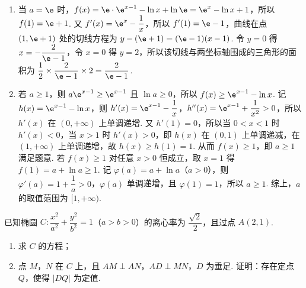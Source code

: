 \begin{solution}
\begin{enumerate}
\item 当 \(a=\e\) 时，\(f(x)=\e\cdot\e^{x-1}-\ln x+\ln\e=\e^x-\ln x+1\)，所以 \(f(1)=\e+1\). 又 \(f'(x)=\e^x-\dfrac1x\)，所以 \(f'(1)=\e-1\)，曲线在点 \((1,\e+1)\) 处的切线方程为 \(y-(\e+1)=(\e-1)(x-1)\). 令 \(y=0\) 得 \(x=-\dfrac{2}{\e-1}\)，令 \(x=0\) 得 \(y=2\)，所以该切线与两坐标轴围成的三角形的面积为 \(\dfrac12\times\dfrac{2}{\e-1}\times2=\dfrac{2}{\e-1}\).
\item 若 \(a\ge1\)，则 \(a\e^{x-1}\ge\e^{x-1}\) 且 \(\ln a\ge0\)，所以 \(f(x)\ge\e^{x-1}-\ln x\). 记 \(h(x)=\e^{x-1}-\ln x\)，则 \(h'(x)=\e^{x-1}-\dfrac1x\)，\(h''(x)=\e^{x-1}+\dfrac1{x^2}>0\)，所以 \(h'(x)\) 在 \((0,+\infty)\) 上单调递增. 又 \(h'(1)=0\)，所以当 \(0<x<1\) 时 \(h'(x)<0\)，当 \(x>1\) 时 \(h'(x)>0\)，即 \(h(x)\) 在 \((0,1)\) 上单调递减，在 \((1,+\infty)\) 上单调递增，故 \(h(x)\ge h(1)=1\). 从而 \(f(x)\ge1\)，即 \(a\ge1\) 满足题意.
若 \(f(x)\ge1\) 对任意 \(x>0\) 恒成立，取 \(x=1\) 得 \(f(1)=a+\ln a\ge1\). 记 \(\varphi(a)=a+\ln a\)（\(a>0\)），则 \(\varphi'(a)=1+\dfrac1a>0\)，\(\varphi(a)\) 单调递增，且 \(\varphi(1)=1\)，所以 \(a\ge1\). 综上，\(a\) 的取值范围为 \([1,+\infty)\).
\end{enumerate}
\end{solution}

\begin{problem}
已知椭圆 \(C:\dfrac{x^2}{a^2}+\dfrac{y^2}{b^2}=1\)（\(a>b>0\)）的离心率为 \(\dfrac{\sqrt{2}}{2}\)，且过点 \(A\left( 2,1 \right)\).

\begin{enumerate}
\item 求 \(C\) 的方程；
\item 点 \(M\)，\(N\) 在 \(C\) 上，且 \(AM\perp AN\)，\(AD\perp MN\)，\(D\) 为垂足. 证明：存在定点 \(Q\)，使得 \(|DQ|\) 为定值.
\end{enumerate}
\end{problem}

